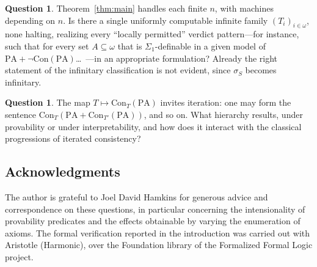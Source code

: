 \documentclass[11pt]{amsart}
\theoremstyle{definition}
\newtheorem{question}[theorem]{Question}
\theoremstyle{remark}
\newcommand{\PA}{\mathrm{PA}}
\newcommand{\Con}{\mathrm{Con}}
\begin{document}
\begin{question}\label{q:infinite}
Theorem~\ref{thm:main} handles each finite $n$, with machines depending
on $n$. Is there a single uniformly computable infinite family
$(T_i)_{i\in\omega}$, none halting, realizing every ``locally
permitted'' verdict pattern---for instance, such that for every set
$A\subseteq\omega$ that is $\Sigma_1$-definable in a given model of
$\PA+\neg\Con(\PA)$\dots\ ---in an appropriate formulation? Already the
right statement of the infinitary classification is not evident, since
$\sigma_S$ becomes infinitary.
\end{question}

\begin{question}\label{q:iterate}
The map $T\mapsto\Con_T(\PA)$ invites iteration: one may form the
sentence $\Con_T(\PA+\Con_{T'}(\PA))$, and so on. What hierarchy
results, under provability or under interpretability, and how does it
interact with the classical progressions of iterated consistency?
\end{question}

\subsection*{Acknowledgments}
The author is grateful to Joel David Hamkins for generous advice and
correspondence on these questions, in particular concerning the
intensionality of provability predicates and the effects obtainable by
varying the enumeration of axioms. The formal verification reported in
the introduction was carried out with Aristotle (Harmonic), over the
Foundation library of the Formalized Formal Logic project.
\end{document}
